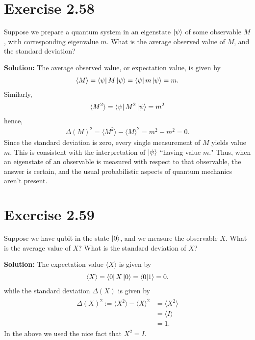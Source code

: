 \documentclass{book}
\begin{document}
\section*{Exercise 2.58}
    Suppose we prepare a quantum system in an eigenstate $\ket{\psi}$ of some observable $M$ , with corresponding eigenvalue $m$. What is the average observed value of $M$, and the standard deviation?

    \textbf{Solution:} The average observed value, or expectation value, is given by
    \begin{align}
        \langle M\rangle = \bra{\psi}M\ket{\psi} = \bra{\psi}m\ket{\psi} = m.
    \end{align}
    Similarly,
    \begin{align}
        \langle M^2 \rangle = \bra{\psi}M^2\ket{\psi} = m^2
    \end{align}
    hence,
    \begin{align}
        \Delta(M)^2 = \langle M^2 \rangle - \langle M \rangle ^2  = m^2 - m^2 = 0.
    \end{align}
    Since the standard deviation is zero, every single measurement of $M$ yields value $m$. This is consistent with the interpretation of $\ket{\psi}$ ``having value $m$." Thus, when an eigenstate of an observable is measured with respect to that observable, the answer is certain, and the usual probabilistic aspects of quantum mechanics aren't present.

\section*{Exercise 2.59}
    Suppose we have qubit in the state $\ket{0}$, and we measure the observable $X$. What is the average value of $X$? What is the standard deviation of $X$?

    \textbf{Solution:} The expectation value $\langle X \rangle$ is given by
    \begin{align}
        \langle X \rangle = \bra{0} X \ket{0} = \bra{0} \ket{1} = 0.
    \end{align}
    while the standard deviation $\Delta(X)$ is given by
    \begin{align}
    \begin{aligned}
        \Delta(X)^2 := \langle X^2 \rangle - \langle X \rangle^2 &= \langle X^2 \rangle \\
        &= \langle I \rangle \\
        &= 1.
    \end{aligned}
    \end{align}
    In the above we used the nice fact that $X^2 = I$.
\end{document}
